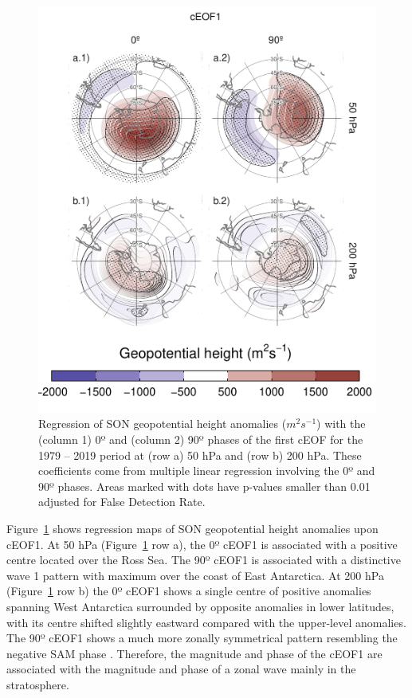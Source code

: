 \documentclass[pdflatex,sn-basic]{sn-jnl}
\theoremstyle{thmstyleone}%
\theoremstyle{thmstyletwo}%
\theoremstyle{thmstylethree}%
\begin{document}
\begin{figure}
\centering
\includegraphics{../figures/eof1-regr-gh-1.pdf}
\caption{\label{fig:eof1-regr-gh}Regression of SON geopotential height anomalies (\(m^2s^{-1}\)) with the (column 1) 0º and (column 2) 90º phases of the first cEOF for the 1979 -- 2019 period at (row a) 50 hPa and (row b) 200 hPa. These coefficients come from multiple linear regression involving the 0º and 90º phases. Areas marked with dots have p-values smaller than 0.01 adjusted for False Detection Rate.}
\end{figure}

Figure~\ref{fig:eof1-regr-gh} shows regression maps of SON geopotential height anomalies upon cEOF1.
At 50 hPa (Figure~\ref{fig:eof1-regr-gh} row a), the 0º cEOF1 is associated with a positive centre located over the Ross Sea.
The 90º cEOF1 is associated with a distinctive wave 1 pattern with maximum over the coast of East Antarctica.
At 200 hPa (Figure~\ref{fig:eof1-regr-gh} row b) the 0º cEOF1 shows a single centre of positive anomalies spanning West Antarctica surrounded by opposite anomalies in lower latitudes, with its centre shifted slightly eastward compared with the upper-level anomalies.
The 90º cEOF1 shows a much more zonally symmetrical pattern resembling the negative SAM phase \citep[e.g.][]{fogt2020}.
Therefore, the magnitude and phase of the cEOF1 are associated with the magnitude and phase of a zonal wave mainly in the stratosphere.
\end{document}
